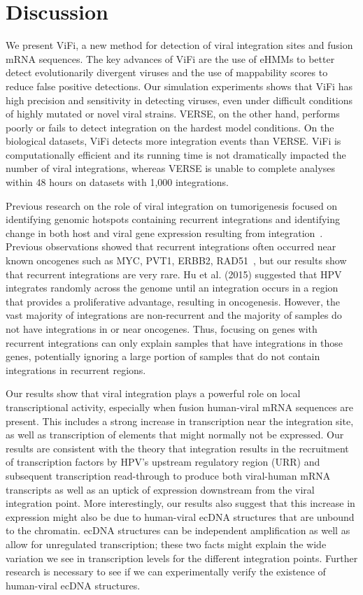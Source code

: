 \documentclass[10pt]{article}
\begin{document}
\section*{Discussion}
We present ViFi, a new method for detection of viral integration sites and fusion mRNA sequences.  The key advances of ViFi are the use of eHMMs to better detect evolutionarily divergent viruses and the use of mappability scores to reduce false positive detections.  Our simulation experiments shows that ViFi has high precision and sensitivity in detecting viruses, even under difficult conditions of highly mutated or novel viral strains.  VERSE, on the other hand, performs poorly or fails to detect integration on the hardest model conditions.  On the biological datasets, ViFi detects more integration events than VERSE.  ViFi is computationally efficient and its running time is not dramatically impacted the number of viral integrations, whereas VERSE is unable to complete analyses within 48 hours on datasets with 1,000 integrations.

Previous research on the role of viral integration on tumorigenesis focused on identifying genomic hotspots containing recurrent integrations and identifying change in both host and viral gene expression resulting from integration~\cite{Tang2013,Lawrence2015,Hu2015,Zhang2016}.  Previous observations showed that recurrent integrations often occurred near known oncogenes such as MYC, PVT1, ERBB2, RAD51~\cite{Tang2013}, but our results show that recurrent integrations are very rare.  Hu et al. (2015) suggested that HPV integrates randomly across the genome until an integration occurs in a region that provides a proliferative advantage, resulting in oncogenesis.  However, the vast majority of integrations are non-recurrent and the majority of samples do not have integrations in or near oncogenes.  Thus, focusing on genes with recurrent integrations can only explain samples that have integrations in those genes, potentially ignoring a large portion of samples that do not contain integrations in recurrent regions.

Our results show that viral integration plays a powerful role on local transcriptional activity, especially when fusion human-viral mRNA sequences are present.  This includes a strong increase in transcription near the integration site, as well as transcription of elements that might normally not be expressed.  Our results are consistent with the theory that integration results in the recruitment of transcription factors by HPV's upstream regulatory region (URR) and subsequent transcription read-through to produce both viral-human mRNA transcripts as well as an uptick of expression downstream from the viral integration point.  More interestingly, our results also suggest that this increase in expression might also be due to human-viral ecDNA structures that are unbound to the chromatin.  ecDNA structures can be independent amplification as well as allow for unregulated transcription; these two facts might explain the wide variation we see in transcription levels for the different integration points.  Further research is necessary to see if we can experimentally verify the existence of human-viral ecDNA structures.
\end{document}
